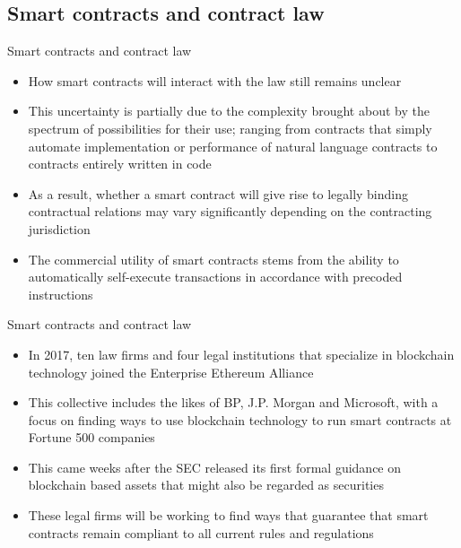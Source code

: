 \documentclass[11pt]{beamer}
\begin{document}

\subsection{Smart contracts and contract law}

\begin{frame}{Smart contracts and contract law}
	\begin{itemize}
		\item How smart contracts will interact with the law still remains unclear
		\item This uncertainty is partially due to the complexity brought about by the spectrum of possibilities for their use; ranging from contracts that simply automate implementation or performance of natural language contracts to contracts entirely written in code
		\item As a result, whether a smart contract will give rise to legally binding contractual relations may vary significantly depending on the contracting jurisdiction
		\item The commercial utility of smart contracts stems from the ability to automatically self-execute transactions in accordance with precoded instructions
	\end{itemize}
\end{frame}



\begin{frame}{Smart contracts and contract law}
	\begin{itemize}
		\item In 2017, ten law firms and four legal institutions that specialize in blockchain technology joined the Enterprise Ethereum Alliance
		\item This collective includes the likes of BP, J.P. Morgan and Microsoft, with a focus on finding ways to use blockchain technology to run smart contracts at Fortune 500 companies
		\item This came weeks after the SEC released its first formal guidance on blockchain based assets that might also be regarded as securities
		\item These legal firms will be working to find ways that guarantee that smart contracts remain compliant to all current rules and regulations
	\end{itemize}
\end{frame}
\end{document}
